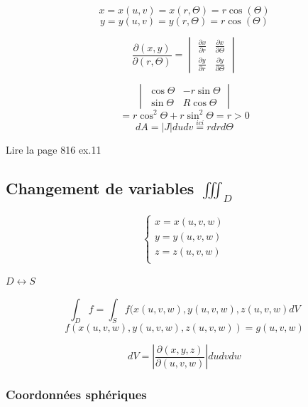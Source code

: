 $$x=x(u,v)=x(r,\Theta)=r\cos(\Theta)$$
$$y=y(u,v)=y(r,\Theta)=r\cos(\Theta)$$





\[
\frac{\partial (x,y)}{\partial (r, \Theta)} =
\begin{vmatrix}
\frac{\partial x}{\partial r}& \frac{\partial x}{\partial \Theta}\\
\frac{\partial y}{\partial r}& \frac{\partial y}{\partial \Theta}
\end{vmatrix}
\]

$$\begin{vmatrix}
\cos\Theta & -r\sin\Theta\\
\sin\Theta & R\cos\Theta
\end{vmatrix}$$
\[=r\cos^2\Theta +r\sin^2\Theta = r > 0\]
$$dA = |J|dudv \overset{ici}{=}r dr d\Theta $$

\begin{myrem}

Lire la page 816 ex.11
\end{myrem}

\subsection{Changement de variables $ \iiint_D $}
$$
\left\{
\begin{array}{l}
x=x(u,v,w)\\
y=y(u,v,w)\\
z=z(u,v,w)\\
\end{array}
\right.
$$

$D \longleftrightarrow S $

\[\int_D f = \int_S f (x(u,v,w),y(u,v,w),z(u,v,w) dV\]
\[f (x(u,v,w),y(u,v,w),z(u,v,w)) = g(u,v,w)\]

\[dV=\left|\frac{\partial(x,y,z)}{\partial(u,v,w)}\right|dudvdw\]



\subsubsection{Coordonnées sphériques}

